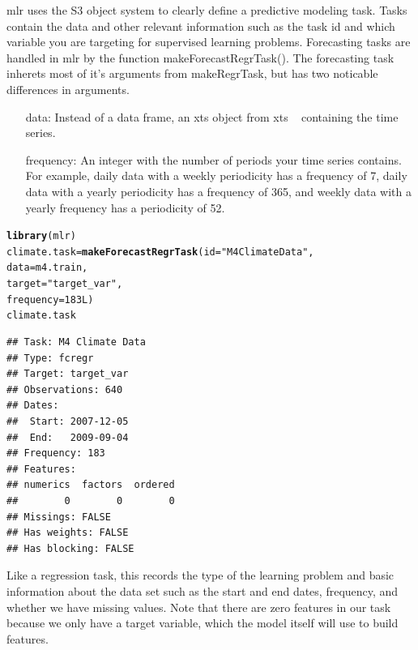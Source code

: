 \documentclass{article}\usepackage[]{graphicx}\usepackage[]{color}
\makeatletter
\newcommand{\hlnum}[1]{\textcolor[rgb]{0.686,0.059,0.569}{#1}}%
\newcommand{\hlstr}[1]{\textcolor[rgb]{0.192,0.494,0.8}{#1}}%
\newcommand{\hlstd}[1]{\textcolor[rgb]{0.345,0.345,0.345}{#1}}%
\newcommand{\hlkwb}[1]{\textcolor[rgb]{0.69,0.353,0.396}{#1}}%
\newcommand{\hlkwc}[1]{\textcolor[rgb]{0.333,0.667,0.333}{#1}}%
\newcommand{\hlkwd}[1]{\textcolor[rgb]{0.737,0.353,0.396}{\textbf{#1}}}%
\newenvironment{kframe}{%
 \def\at@end@of@kframe{}%
 \ifinner\ifhmode%
  \def\at@end@of@kframe{\end{minipage}}%
  \begin{minipage}{\columnwidth}%
 \fi\fi%
 \def\FrameCommand##1{\hskip\@totalleftmargin \hskip-\fboxsep
 \colorbox{shadecolor}{##1}\hskip-\fboxsep
     \hskip-\linewidth \hskip-\@totalleftmargin \hskip\columnwidth}%
 \MakeFramed {\advance\hsize-\width
   \@totalleftmargin\z@ \linewidth\hsize
   \@setminipage}}%
 {\par\unskip\endMakeFramed%
 \at@end@of@kframe}
\newenvironment{knitrout}{}{} %
\theoremstyle{definition}
\newcommand\code{\@codex}
\def\@codex#1{{\normalfont\ttfamily\hyphenchar\font=-1 #1}}
\newcommand{\pkg}[1]{{\fontseries{b}\selectfont #1}}
\makeatother
\begin{document}
\pkg{mlr} uses the S3 object system to clearly define a predictive modeling task. Tasks contain the data and other relevant information such as the task id and which variable you are targeting for supervised learning problems. Forecasting tasks are handled in \pkg{mlr} by the function \code{makeForecastRegrTask()}. The forecasting task inherets most of it's arguments from \code{makeRegrTask}, but has two noticable differences in arguments.

\begin{itemize}
\item[data:] Instead of a data frame, an xts object from \pkg{xts} ~\cite{xts} containing the time series.
\item[frequency:] An integer with the number of periods your time series contains. For example, daily data with a weekly periodicity has a frequency of 7, daily data with a yearly periodicity has a frequency of 365, and weekly data with a yearly frequency has a periodicity of 52.
\end{itemize}

\begin{knitrout}
\color{fgcolor}\begin{kframe}
\begin{alltt}
\hlkwd{library}\hlstd{(mlr)}
\hlstd{climate.task} \hlkwb{=} \hlkwd{makeForecastRegrTask}\hlstd{(}\hlkwc{id} \hlstd{=} \hlstr{"M4 Climate Data"}\hlstd{,}
                                 \hlkwc{data} \hlstd{= m4.train,}
                                 \hlkwc{target} \hlstd{=} \hlstr{"target_var"}\hlstd{,}
                                 \hlkwc{frequency} \hlstd{=} \hlnum{183L}\hlstd{)}
\hlstd{climate.task}
\end{alltt}
\begin{verbatim}
## Task: M4 Climate Data
## Type: fcregr
## Target: target_var
## Observations: 640
## Dates:
##  Start: 2007-12-05 
##  End:   2009-09-04
## Frequency: 183
## Features:
## numerics  factors  ordered 
##        0        0        0 
## Missings: FALSE
## Has weights: FALSE
## Has blocking: FALSE
\end{verbatim}
\end{kframe}
\end{knitrout}

Like a regression task, this records the type of the learning problem and basic information about the data set such as the start and end dates, frequency, and whether we have missing values. Note that there are zero features in our task because we only have a target variable, which the model itself will use to build features.
\end{document}
